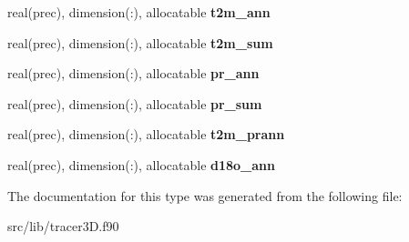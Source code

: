 \begin{DoxyCompactItemize}
\mbox{\label{structtracer3d_1_1tracer__dep__class_a4345f4c12352a0a61170b9ae6253cb3d}} 
real(prec), dimension(\+:), allocatable {\bfseries t2m\+\_\+ann}
\item 
\mbox{\label{structtracer3d_1_1tracer__dep__class_a4d752a062b60d3ca6bb48fc3b396a4ad}} 
real(prec), dimension(\+:), allocatable {\bfseries t2m\+\_\+sum}
\item 
\mbox{\label{structtracer3d_1_1tracer__dep__class_a95132f8073ed9606a3d970add2d64acd}} 
real(prec), dimension(\+:), allocatable {\bfseries pr\+\_\+ann}
\item 
\mbox{\label{structtracer3d_1_1tracer__dep__class_abe74cc6e8d31ea0ba3d00351b4c8b8db}} 
real(prec), dimension(\+:), allocatable {\bfseries pr\+\_\+sum}
\item 
\mbox{\label{structtracer3d_1_1tracer__dep__class_abb18f335dbe324d663ef696d47409316}} 
real(prec), dimension(\+:), allocatable {\bfseries t2m\+\_\+prann}
\item 
\mbox{\label{structtracer3d_1_1tracer__dep__class_ad1d5702c4c242bf9d15618d6c34835d2}} 
real(prec), dimension(\+:), allocatable {\bfseries d18o\+\_\+ann}
\end{DoxyCompactItemize}


The documentation for this type was generated from the following file\+:\begin{DoxyCompactItemize}
\item 
src/lib/tracer3\+D.\+f90\end{DoxyCompactItemize}
